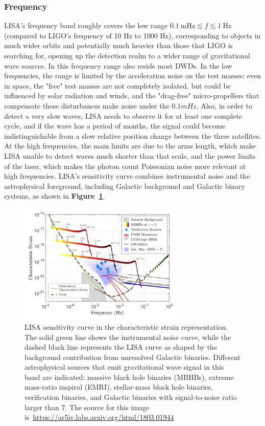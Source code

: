 \subsubsection{Frequency}
LISA's frequency band roughly covers the low range $0.1~\mathrm{mHz} \lesssim f \lesssim 1~\mathrm{Hz}$ (compared to LIGO's frequency of 10 Hz to 1000 Hz), corresponding to objects in much wider orbits and potentially much heavier than those that LIGO is searching for, opening up the detection realm to a wider range of gravitational wave sources. 
In this frequency range also reside most DWDs.  
In the low frequencies, the range is limited by the acceleration noise on the test masses: even in space, the "free" test masses are not completely isolated, but could be influenced by solar radiation and winds, and the "drag-free" micro-propellers that compensate these disturbances make noise under the $0.1mHz$. 
Also, in order to detect a very slow waves, LISA needs to observe it for at least one complete cycle, and if the wave has a period of months, the signal could become indistinguishable from a slow relative position change between the three satellites.
At the high frequencies, the main limits are due to the arms length, which make LISA unable to detect waves much shorter than that scale, and the power limits of the laser, which makes the photon count Poissonian noise more relevant at high frequencies.  
LISA’s sensitivity curve combines instrumental noise and the astrophysical foreground, including Galactic background and Galactic binary systems, as shown in \textbf{Figure~\ref{fig: LISA sens curve with noises}}. 
\begin{figure}
    \begin{center}
        \includegraphics[width=0.7\textwidth]{images/lisa_sensitivity_with_noises.png}
    \end{center}
    \caption{LISA sensitivity curve in the characteristic strain representation.
    The solid green line shows the instrumental noise curve, while the dashed black line represents the LISA curve as shaped by the background contribution from unresolved Galactic binaries.
    Different astrophysical sources that emit gravitational wave signal in this band are indicated: massive black hole binaries (MBHBs), extreme mass-ratio inspiral (EMRI), stellar-mass black hole binaries, verification binaries, and Galactic binaries with signal-to-noise ratio larger than 7.
    The source for this image is~\url{https://ar5iv.labs.arxiv.org/html/1803.01944}}\label{fig: LISA sens curve with noises}
\end{figure}
